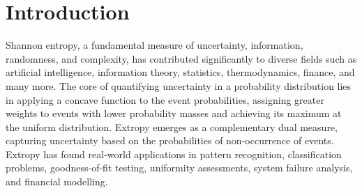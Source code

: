 \documentclass[pdflatex]{sn-jnl}%
\theoremstyle{thmstyleone}
\theoremstyle{thmstyletwo}%
\theoremstyle{thmstylethree}%
\begin{document}


\maketitle

\section{Introduction}\label{sec1}
Shannon entropy, a fundamental measure of uncertainty, information, randomness, and complexity, has contributed significantly to diverse fields such as artificial intelligence, information theory, statistics, thermodynamics, finance, and many more\cite{shannon1948mathematical,kumar2025entropy}. The core of quantifying uncertainty in a probability distribution lies in applying a concave function to the event probabilities, assigning greater weights to events with lower probability masses and achieving its maximum at the uniform distribution. Extropy\cite{lad2015extropy} emerges as a complementary dual measure, capturing uncertainty based on the probabilities of non-occurrence of events. Extropy has found real-world applications in pattern recognition\cite{balakrishnan2022tsallis,kazemi2021fractional,deng2024plausibility}, classification problems\cite{buono2024unified}, goodness-of-fit testing\cite{sathar2021dynamic,gupta2024some}, uniformity assessments\cite{qiu2018extropy}, system failure analysis\cite{qiu2019extropy}, and financial modelling\cite{tahmasebi2022negative}.
\end{document}
